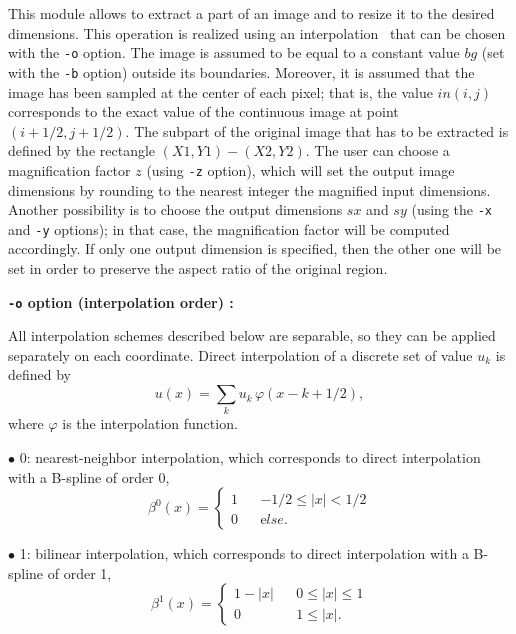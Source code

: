 This module allows to extract a part of an image and to resize it to
the desired dimensions. This operation is realized using an 
interpolation~\cite{thevenaz.blu.ea:image}\cite{unser.aldroubi.ea:fast}
that can be chosen with the \verb+-o+ option. The image is assumed
to be equal to a constant value $bg$ (set with the \verb+-b+ option)
outside its boundaries. Moreover, it is assumed that the image
has been sampled at the center of each pixel; that is, the value 
$in(i,j)$ corresponds to the exact value of the continuous image
at point $(i+1/2,j+1/2)$. The subpart of the original image that has
to be extracted is defined by the rectangle $(X1,Y1)-(X2,Y2)$. The user
can choose a magnification factor $z$ (using \verb+-z+ option), 
which will set the output image dimensions by rounding to the nearest 
integer the magnified input dimensions. Another possibility is to choose 
the output dimensions $sx$ and $sy$ (using the \verb+-x+ and \verb+-y+ 
options); in that case, the magnification factor will be computed 
accordingly. If only one output dimension is specified, then the other
one will be set in order to preserve the aspect ratio of the original 
region.

\medskip

{\bf \verb+-o+ option (interpolation order) :} 

\smallskip

All interpolation schemes described below are separable, so they can
be applied separately on each coordinate. Direct interpolation of 
a discrete set of value $u_k$ is defined by 
$$u(x) = \sum_k u_k \,\varphi(x-k+1/2),$$
where $\varphi$ is the interpolation function.

$\bullet$ 0: nearest-neighbor interpolation, which corresponds to direct 
interpolation with a B-spline of order 0,
$$\beta^0(x) = \left\{\begin{array}{lcl}
1       & & -1/2 \leq |x| < 1/2 \\ 
0       & & {\mathrm else}.
\end{array}\right.$$

$\bullet$ 1: bilinear interpolation, which corresponds to direct interpolation
with a B-spline of order 1,
$$\beta^1(x) = \left\{\begin{array}{lcl}
1-|x|   & & 0 \leq |x| \leq 1 \\ 
0       & & 1 \leq |x|.
\end{array}\right.$$

